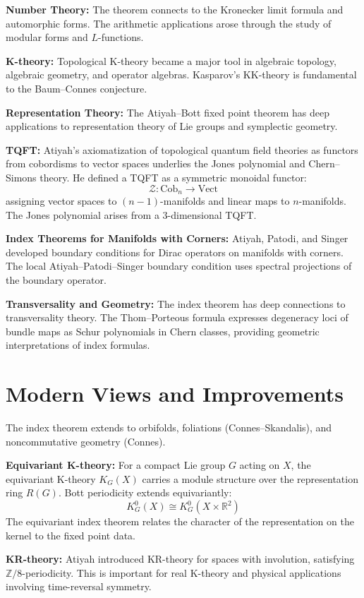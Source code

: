 \textbf{Number Theory:} The theorem connects to the Kronecker limit formula and
automorphic forms. The arithmetic applications arose through the study of
modular forms and $L$-functions.

\textbf{K-theory:} Topological K-theory became a major tool in algebraic
topology, algebraic geometry, and operator algebras. Kasparov's KK-theory is
fundamental to the Baum--Connes conjecture.

\textbf{Representation Theory:} The Atiyah--Bott fixed point theorem has deep
applications to representation theory of Lie groups and symplectic geometry.

\textbf{TQFT:} Atiyah's axiomatization of topological quantum field theories as
functors from cobordisms to vector spaces underlies the Jones polynomial and
Chern--Simons theory. He defined a TQFT as a symmetric monoidal functor:
\[\mathcal{Z}: \text{Cob}_n \to \text{Vect}\]
assigning vector spaces to $(n-1)$-manifolds and linear maps to $n$-manifolds.
The Jones polynomial arises from a 3-dimensional TQFT.

\textbf{Index Theorems for Manifolds with Corners:}
Atiyah, Patodi, and Singer developed boundary conditions for Dirac operators
on manifolds with corners. The local Atiyah--Patodi--Singer boundary condition
uses spectral projections of the boundary operator.

\textbf{Transversality and Geometry:}
The index theorem has deep connections to transversality theory. The
Thom--Porteous formula expresses degeneracy loci of bundle maps as
Schur polynomials in Chern classes, providing geometric interpretations
of index formulas.

\section{Modern Views and Improvements}

The index theorem extends to orbifolds, foliations (Connes--Skandalis), and
noncommutative geometry (Connes).

\textbf{Equivariant K-theory:} For a compact Lie group $G$ acting on $X$, the
equivariant K-theory $K_G(X)$ carries a module structure over the representation
ring $R(G)$. Bott periodicity extends equivariantly:
\[K_G^0(X) \cong K_G^0(X \times \mathbb{R}^2)\]
The equivariant index theorem relates the character of the representation on
the kernel to the fixed point data.

\textbf{KR-theory:} Atiyah introduced KR-theory for spaces with involution,
satisfying $\mathbb{Z}/8$-periodicity. This is important for real K-theory and
physical applications involving time-reversal symmetry.

